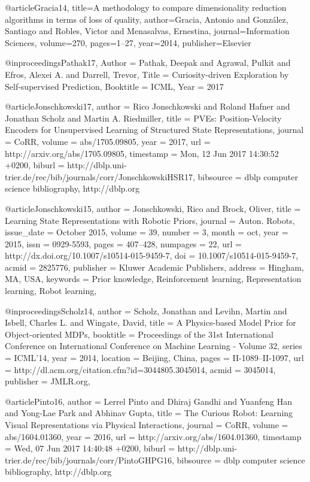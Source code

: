 
@article{Gracia14,
	title={A methodology to compare dimensionality reduction algorithms in terms of loss of quality},
	author={Gracia, Antonio and Gonz{\'a}lez, Santiago and Robles, Victor and Menasalvas, Ernestina},
	journal={Information Sciences},
	volume={270},
	pages={1--27},
	year={2014},
	publisher={Elsevier}
}

@inproceedings{Pathak17,
	Author = {Pathak, Deepak and
		Agrawal, Pulkit and
		Efros, Alexei A. and
		Darrell, Trevor},
	Title = {Curiosity-driven Exploration
		by Self-supervised Prediction},
	Booktitle = {ICML},
	Year = {2017}
}

@article{Jonschkowski17,
  author    = {Rico Jonschkowski and
               Roland Hafner and
               Jonathan Scholz and
               Martin A. Riedmiller},
  title     = {PVEs: Position-Velocity Encoders for Unsupervised Learning of Structured
               State Representations},
  journal   = {CoRR},
  volume    = {abs/1705.09805},
  year      = {2017},
  url       = {http://arxiv.org/abs/1705.09805},
  timestamp = {Mon, 12 Jun 2017 14:30:52 +0200},
  biburl    = {http://dblp.uni-trier.de/rec/bib/journals/corr/JonschkowskiHSR17},
  bibsource = {dblp computer science bibliography, http://dblp.org}
}

@article{Jonschkowski15,
 author = {Jonschkowski, Rico and Brock, Oliver},
 title = {Learning State Representations with Robotic Priors},
 journal = {Auton. Robots},
 issue_date = {October   2015},
 volume = {39},
 number = {3},
 month = oct,
 year = {2015},
 issn = {0929-5593},
 pages = {407--428},
 numpages = {22},
 url = {http://dx.doi.org/10.1007/s10514-015-9459-7},
 doi = {10.1007/s10514-015-9459-7},
 acmid = {2825776},
 publisher = {Kluwer Academic Publishers},
 address = {Hingham, MA, USA},
 keywords = {Prior knowledge, Reinforcement learning, Representation learning, Robot learning},
} 

@inproceedings{Scholz14,
 author = {Scholz, Jonathan and Levihn, Martin and Isbell, Charles L. and Wingate, David},
 title = {A Physics-based Model Prior for Object-oriented MDPs},
 booktitle = {Proceedings of the 31st International Conference on International Conference on Machine Learning - Volume 32},
 series = {ICML'14},
 year = {2014},
 location = {Beijing, China},
 pages = {II-1089--II-1097},
 url = {http://dl.acm.org/citation.cfm?id=3044805.3045014},
 acmid = {3045014},
 publisher = {JMLR.org},
} 

@article{Pinto16,
  author    = {Lerrel Pinto and
               Dhiraj Gandhi and
               Yuanfeng Han and
               Yong{-}Lae Park and
               Abhinav Gupta},
  title     = {The Curious Robot: Learning Visual Representations via Physical Interactions},
  journal   = {CoRR},
  volume    = {abs/1604.01360},
  year      = {2016},
  url       = {http://arxiv.org/abs/1604.01360},
  timestamp = {Wed, 07 Jun 2017 14:40:48 +0200},
  biburl    = {http://dblp.uni-trier.de/rec/bib/journals/corr/PintoGHPG16},
  bibsource = {dblp computer science bibliography, http://dblp.org}
}



